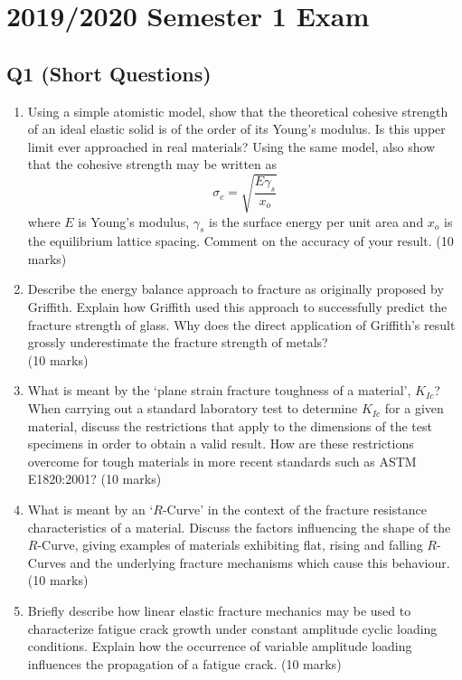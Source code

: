\chapter{2019/2020 Semester 1 Exam}
\section{Q1 (Short Questions)}

\begin{enumerate}[label=(\alph*)]
\item Using a simple atomistic model, show that the theoretical cohesive strength of an ideal elastic solid is of the order of its Young’s modulus. Is this upper limit ever approached in real materials? Using the same model, also show that the cohesive strength may be written as
$$\sigma_c = \sqrt{\frac{E\gamma_s}{x_o}}$$
where $E$ is Young's modulus, $\gamma_s$ is the surface energy per unit area and $x_o$ is the equilibrium lattice spacing. Comment on the accuracy of your result. \hfill(10 marks)

\item Describe the energy balance approach to fracture as originally proposed by Griffith. Explain how Griffith used this approach to successfully predict the fracture strength of glass. Why does the direct application of Griffith's result grossly underestimate the fracture strength of metals? \\ \hfill(10 marks)

\item What is meant by the `plane strain fracture toughness of a material', $K_{Ic}$? When carrying out a standard laboratory test to determine $K_{Ic}$ for a given material, discuss the restrictions that apply to the dimensions of the test specimens in order to obtain a valid result. How are these restrictions overcome for tough materials in more recent standards such as ASTM E1820:2001? \hfill(10 marks)

\item What is meant by an `$R$-Curve' in the context of the fracture resistance characteristics of a material. Discuss the factors influencing the shape of the $R$-Curve, giving examples of materials exhibiting flat, rising and falling $R$-Curves and the underlying fracture mechanisms which cause this behaviour. \hfill(10 marks)


\item Briefly describe how linear elastic fracture mechanics may be used to characterize fatigue crack growth under constant amplitude cyclic loading conditions. Explain how the occurrence of variable amplitude loading influences the propagation of a fatigue crack. \hfill(10 marks)



\end{enumerate}
